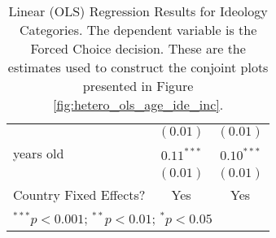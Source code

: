 \begin{table}
\begin{center}
\begin{scriptsize}
\begin{tabular}{l c c}
                                                & $(0.01)$      & $(0.01)$     \\
\quad 79 years old                              & $0.11^{***}$  & $0.10^{***}$ \\
                                                & $(0.01)$      & $(0.01)$     \\
\hline
Country Fixed Effects?                          & Yes           & Yes          \\
\hline
\multicolumn{3}{l}{\tiny{$^{***}p<0.001$; $^{**}p<0.01$; $^{*}p<0.05$}}
\end{tabular}
\end{scriptsize}
\caption{Linear (OLS) Regression Results for Ideology Categories. The dependent variable is the Forced Choice decision. These are the estimates used to construct the conjoint plots presented in Figure \ref{fig:hetero_ols_age_ide_inc}.}
\label{table:ideology_ols}
\end{center}
\end{table}
